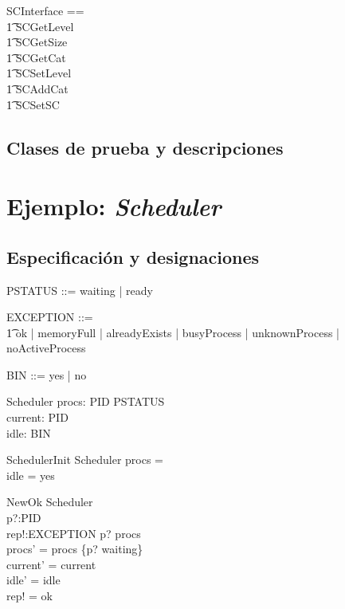 \begin{zed}
SCInterface == \\
  \t1 SCGetLevel \\
  \t1 \lor SCGetSize \\
  \t1 \lor SCGetCat \\
  \t1 \lor SCSetLevel \\
  \t1 \lor SCAddCat \\
  \t1 \lor SCSetSC
\end{zed}

\subsection*{Clases de prueba y descripciones}

\section*{Ejemplo: \textit{Scheduler}}

\subsection*{Especificación y designaciones}

\begin{zed}
[PID]
\end{zed}

\begin{zed}
PSTATUS ::= waiting | ready
\end{zed}

\begin{zed}
EXCEPTION ::= \\
  \t1 ok | memoryFull | alreadyExists | busyProcess | unknownProcess | noActiveProcess
\end{zed}

\begin{zed}
BIN ::= yes | no
\end{zed}


\begin{schema}{Scheduler}
procs: PID \pfun PSTATUS \\
current: PID \\
idle: BIN
\end{schema}


\begin{schema}{SchedulerInit}
Scheduler
\where
procs = \emptyset \\
idle = yes
\end{schema}

\begin{schema}{NewOk}
\Delta Scheduler \\
p?:PID \\
rep!:EXCEPTION
\where
p? \notin \dom procs \\
procs' = procs \cup \{p? \mapsto waiting\} \\
current' = current \\
idle' = idle \\
rep! = ok
\end{schema}

